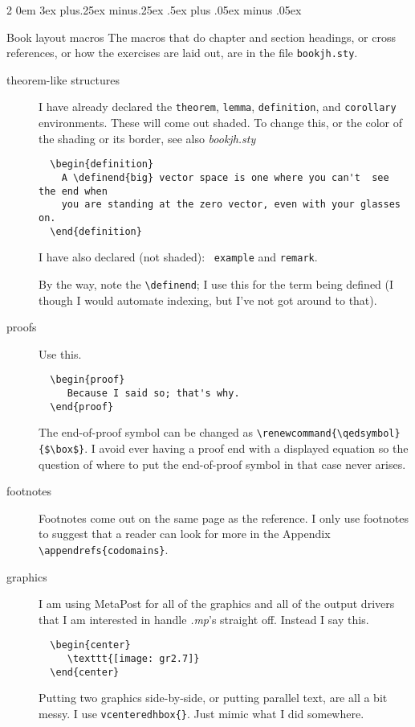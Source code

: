 \documentclass[titlepage]{article}
\makeatletter
\renewcommand{\subsection}{\@startsection{subsection}%
  {2}%
  {0em}%
  {3ex plus.25ex minus.25ex}%
  {.5ex plus .05ex minus .05ex}%
  {\bfseries\raggedright}}
\makeatother
\begin{document}
\subsection{Book layout macros}
The macros that do chapter and section headings, or cross references,
or how the exercises are laid out, are in the file 
\texttt{bookjh.sty}.


\begin{description}
  \item[theorem-like structures]
    I have already declared the
    \texttt{theorem}, \texttt{lemma}, 
    \texttt{definition}, and \texttt{corollary}
    environments.
    These will come out shaded.
    To change this, or the color of the shading or its border, see
    also \textit{bookjh.sty}
\begin{verbatim}
  \begin{definition}
    A \definend{big} vector space is one where you can't  see the end when 
    you are standing at the zero vector, even with your glasses on. 
  \end{definition}
\end{verbatim}
    I have also declared (not shaded):~ \texttt{example} and 
    \texttt{remark}.

    By the way, note the \verb!\definend!; I use this for the
    term being defined (I though I would automate indexing,
    but I've not got around to that).

  \item[proofs]
    Use this.
\begin{verbatim}
  \begin{proof}
     Because I said so; that's why.
  \end{proof}
\end{verbatim}
   The end-of-proof symbol can be changed as
   \verb!\renewcommand{\qedsymbol}{$\box$}!.
   I avoid ever having a proof end with a displayed equation
   so the question of
   where to put the end-of-proof symbol in that case never arises.

  \item[footnotes]
    Footnotes come out on the same page as the reference.
    I only use footnotes 
    to suggest that a reader can look for more in the Appendix
    \verb!\appendrefs{codomains}!.

  \item[graphics]
    I am using MetaPost for all of the graphics and all of the 
    output drivers that I am interested in handle \textit{.mp}'s straight off. 
    Instead I say this.
\begin{verbatim}
  \begin{center}
     \texttt{[image: gr2.7]}
  \end{center}
\end{verbatim}
   Putting two graphics side-by-side, or putting parallel text, are
   all a bit messy.
   I use \verb!vcenteredhbox{}!.
   Just mimic what I did somewhere.


\end{description}
\end{document}
